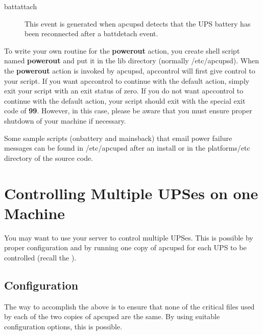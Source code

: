 {{{{{{\begin{description}
\item [battattach]
   This event is generated when apcupsd detects that the UPS battery has been
reconnected after a battdetach event.  
\end{description}

To write your own routine for the {\bf powerout} action, you create shell
script named {\bf powerout} and put it in the lib directory (normally
/etc/apcupsd).  When the {\bf powerout} action is invoked by apcupsd,
apccontrol will first give control to your script.  If you want apccontrol to
continue with the default action, simply exit your script with an exit status
of zero.  If you do not want apccontrol to continue with the default action,
your script should exit with the special exit code of {\bf 99}.  However, in
this case, please be aware that you must ensure proper shutdown of your
machine if necessary.  

Some sample scripts (onbattery and mainsback) that email power failure
messages can be found in /etc/apcupsd after an install or in the
platforms/etc directory of the source code.


\label{Controlling-Multiple-UPSes-on-one-Machine}

\section*{Controlling Multiple UPSes on one Machine}

You may want to use your server to control multiple UPSes. This is possible by
proper configuration and by running one copy of apcupsd for each UPS to be
controlled (recall the 
). 

\label{Configuration}

\subsection*{Configuration}

The way to accomplish the above is to ensure that none of the critical files
used by each of the two copies of apcupsd are the same. By using suitable
configuration options, this is possible. 

\label{The-First-Copy-of-apcupsd}

}}}}}}
